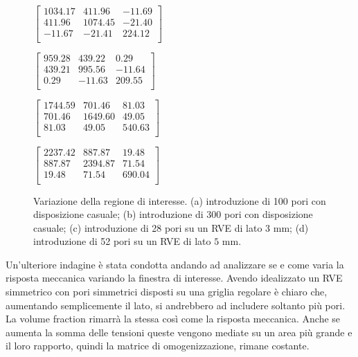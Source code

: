 \documentclass[a4paper,num-refs]{oup-contemporary}
\begin{document}
\begin{figure}
\begin{center}
\begin{minipage}[b]{0.24\linewidth}
					\newline
	\end{minipage} 
\hfill
	\begin{minipage}[b]{0.24\linewidth}
\centering
		\footnotesize{$
			\begin{bmatrix}
			 1034.17 & 411.96 & -11.69 \\
			411.96 & 1074.45 & -21.40 \\
			-11.67 & -21.41 & 224.12 \\
			\end{bmatrix}
			$}
	\end{minipage}
	\begin{minipage}[b]{0.24\linewidth}
\centering
		\footnotesize{$
			\begin{bmatrix}
			 959.28 & 439.22 & 0.29 \\
			439.21 & 995.56 & -11.64 \\
			0.29 & -11.63 & 209.55 \\
			\end{bmatrix}
			$}
	\end{minipage}
	\begin{minipage}[b]{0.24\linewidth}
\centering
		\footnotesize{$
			\begin{bmatrix}
			 1744.59 & 701.46 & 81.03 \\
			701.46 & 1649.60 & 49.05 \\
			81.03 & 49.05 & 540.63 \\
			\end{bmatrix}
			$}
	\end{minipage}
	\begin{minipage}[b]{0.24\linewidth}
\centering
		\footnotesize{$
			\begin{bmatrix}
			 2237.42 & 887.87 & 19.48 \\
			887.87 & 2394.87 & 71.54 \\
			19.48 & 71.54 & 690.04 \\
			\end{bmatrix}
			$}
	\end{minipage}
\hfill
	
	\caption{Variazione della regione di interesse. (a) introduzione di 100 pori con disposizione casuale; (b) introduzione di 300 pori con disposizione casuale; (c) introduzione di 28 pori su un RVE di lato $3$ mm; (d) introduzione di 52 pori su un RVE di lato $5$ mm.}
	\label{fig:area} 
\end{center}
\end{figure}


Un'ulteriore indagine è stata condotta andando ad analizzare se e come varia la risposta meccanica variando la finestra di interesse. Avendo idealizzato un RVE simmetrico con pori simmetrici disposti su una griglia regolare è chiaro che, aumentando semplicemente il lato, si andrebbero ad includere soltanto più pori. La volume fraction rimarrà la stessa così come la risposta meccanica. Anche se aumenta la somma delle tensioni queste vengono mediate su un area più grande e il loro rapporto, quindi la matrice di omogenizzazione, rimane costante. 
\end{document}
